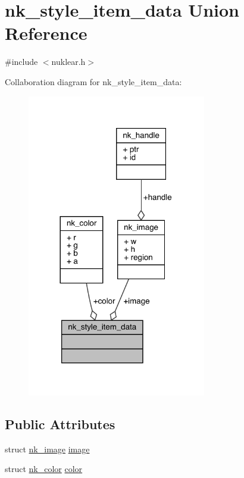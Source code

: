 \hypertarget{unionnk__style__item__data}{}\section{nk\+\_\+style\+\_\+item\+\_\+data Union Reference}
\label{unionnk__style__item__data}


{\ttfamily \#include $<$nuklear.\+h$>$}



Collaboration diagram for nk\+\_\+style\+\_\+item\+\_\+data\+:
\nopagebreak
\begin{figure}[H]
\begin{center}
\leavevmode
\includegraphics[width=221pt]{unionnk__style__item__data__coll__graph}
\end{center}
\end{figure}
\subsection*{Public Attributes}
\begin{DoxyCompactItemize}
\item 
struct \mbox{\hyperlink{structnk__image}{nk\+\_\+image}} \mbox{\hyperlink{unionnk__style__item__data_ae0256c98c4e25f3b8ad0596d6dd68407}{image}}
\item 
struct \mbox{\hyperlink{structnk__color}{nk\+\_\+color}} \mbox{\hyperlink{unionnk__style__item__data_ab7eee146e91f259891435c8c89792938}{color}}
\end{DoxyCompactItemize}


